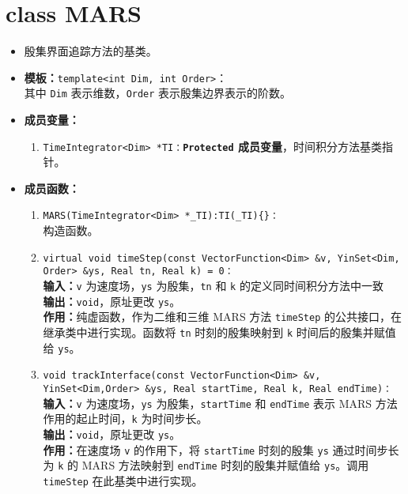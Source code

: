 \documentclass[a4paper,twoside]{ctexart}
\begin{document}
\section{class MARS}
\begin{itemize}
    \item 殷集界面追踪方法的基类。
    \item \textbf{模板：}\texttt{template<int Dim, int Order>}：\\
    其中 \texttt{Dim} 表示维数，\texttt{Order} 表示殷集边界表示的阶数。
    \item \textbf{成员变量：}
        \begin{enumerate}[(1)]
            \item \texttt{TimeIntegrator<Dim> *TI：}\textbf{\texttt{Protected}  成员变量}，时间积分方法基类指针。
        \end{enumerate}
    \item \textbf{成员函数：}
        \begin{enumerate}[(1)]
            \item \texttt{MARS(TimeIntegrator<Dim> *\_TI):TI(\_TI)\{\}：}\\构造函数。
            \item \texttt{virtual void timeStep(const VectorFunction<Dim> \&v, YinSet<Dim, Order> \&ys, Real tn, Real k) = 0：}\\
            \textbf{输入：}\texttt{v} 为速度场，\texttt{ys} 为殷集，\texttt{tn} 和 \texttt{k} 的定义同时间积分方法中一致\\
            \textbf{输出：}\texttt{void}，原址更改 \texttt{ys}。\\
            \textbf{作用：}纯虚函数，作为二维和三维 MARS 方法 \texttt{timeStep} 的公共接口，在继承类中进行实现。函数将 \texttt{tn} 时刻的殷集映射到 \texttt{k} 时间后的殷集并赋值给 \texttt{ys}。
            \item \texttt{void trackInterface(const VectorFunction<Dim> \&v, YinSet<Dim,Order> \&ys, Real startTime, Real k, Real endTime)：}\\
            \textbf{输入：}\texttt{v} 为速度场，\texttt{ys} 为殷集，\texttt{startTime} 和 \texttt{endTime} 表示 MARS 方法作用的起止时间，\texttt{k} 为时间步长。\\
            \textbf{输出：}\texttt{void}，原址更改 \texttt{ys}。\\
            \textbf{作用：}在速度场 \texttt{v} 的作用下，将 \texttt{startTime} 时刻的殷集 \texttt{ys} 通过时间步长为 \texttt{k} 的 MARS 方法映射到 \texttt{endTime} 时刻的殷集并赋值给 \texttt{ys}。调用 \texttt{timeStep} 在此基类中进行实现。
        \end{enumerate}
\end{itemize}
\end{document}
